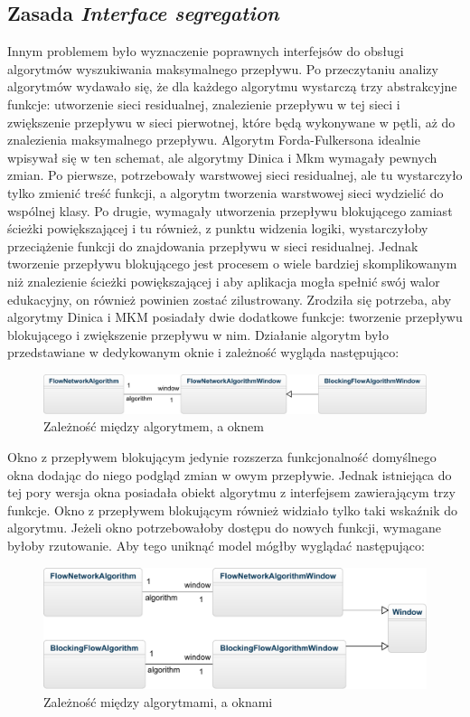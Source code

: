 \subsection{Zasada \textit{Interface segregation}}
Innym problemem było wyznaczenie poprawnych interfejsów do obsługi algorytmów wyszukiwania maksymalnego przepływu. Po przeczytaniu analizy algorytmów wydawało się, że dla każdego algorytmu wystarczą trzy abstrakcyjne funkcje: utworzenie sieci residualnej, znalezienie przepływu w tej sieci i zwiększenie przepływu w sieci pierwotnej, które będą wykonywane w pętli, aż do znalezienia maksymalnego przepływu. Algorytm Forda-Fulkersona idealnie wpisywał się w ten schemat, ale algorytmy Dinica i Mkm wymagały pewnych zmian. Po pierwsze, potrzebowały warstwowej sieci residualnej, ale tu wystarczyło tylko zmienić treść funkcji, a algorytm tworzenia warstwowej sieci wydzielić do wspólnej klasy. Po drugie, wymagały utworzenia przepływu blokującego zamiast ścieżki powiększającej i tu również, z punktu widzenia logiki, wystarczyłoby przeciążenie funkcji do znajdowania przepływu w sieci residualnej. Jednak tworzenie przepływu blokującego jest procesem o wiele bardziej skomplikowanym niż znalezienie ścieżki powiększającej i aby aplikacja mogła spełnić swój walor edukacyjny, on również powinien zostać zilustrowany. Zrodziła się potrzeba, aby algorytmy Dinica i MKM posiadały dwie dodatkowe funkcje: tworzenie przepływu blokującego i zwiększenie przepływu w nim. Działanie algorytm było przedstawiane w dedykowanym oknie i zależność wygląda następująco:
\begin{figure}[H]
	\centering
	\includegraphics[width=0.8\linewidth]{./img/algWindowModel}
	\caption{Zależność między algorytmem, a oknem}
	\label{fig:algorytmOknoModel1}
\end{figure}
Okno z przepływem blokującym jedynie rozszerza funkcjonalność domyślnego okna dodając do niego podgląd zmian w owym przepływie. Jednak istniejąca do tej pory wersja okna posiadała obiekt algorytmu z interfejsem zawierającym trzy funkcje. Okno z przepływem blokującym również widziało tylko taki wskaźnik do algorytmu. Jeżeli okno potrzebowałoby dostępu do nowych funkcji, wymagane byłoby rzutowanie. Aby tego uniknąć model mógłby wyglądać następująco:
\begin{figure}[H]
	\centering
	\includegraphics[width=0.8\linewidth]{./img/algWindowModel2}
	\caption{Zależność między algorytmami, a oknami}
	\label{fig:algorytmOknoModel2}
\end{figure}
